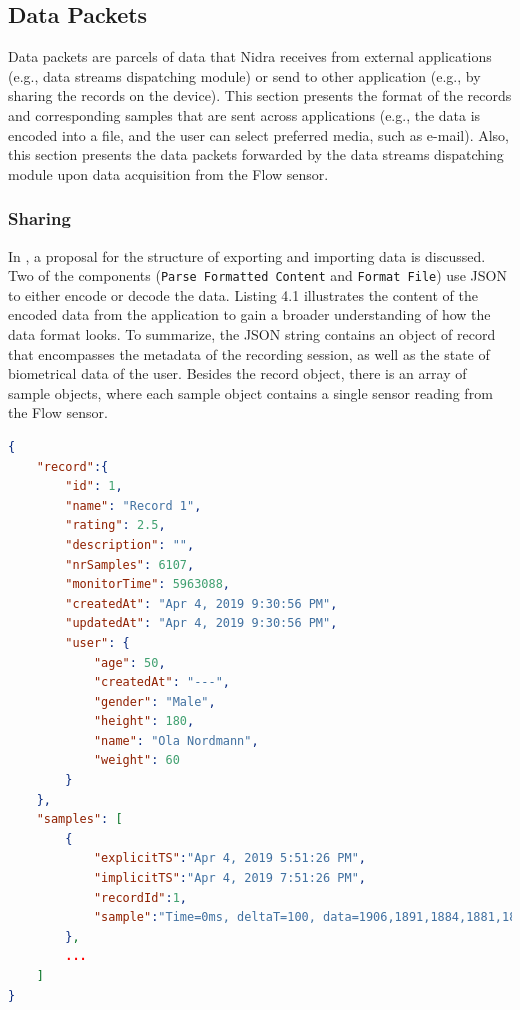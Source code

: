 \subsection{Data Packets}\label{design:datapackets}
Data packets are parcels of data that Nidra receives from external applications (e.g., data streams dispatching module) or send to other application (e.g., by sharing the records on the device). This section presents the format of the records and corresponding samples that are sent across applications (e.g., the data is encoded into a file, and the user can select preferred media, such as e-mail). Also, this section presents the data packets forwarded by the data streams dispatching module upon data acquisition from the Flow sensor.

\subsubsection{Sharing}

In , a proposal for the structure of exporting and importing data is discussed. Two of the components (\verb|Parse Formatted Content| and \verb|Format File|) use JSON to either encode or decode the data. Listing 4.1 illustrates the content of the encoded data from the application to gain a broader understanding of how the data format looks. To summarize, the JSON string contains an object of record that encompasses the metadata of the recording session, as well as the state of biometrical data of the user. Besides the record object, there is an array of sample objects, where each sample object contains a single sensor reading from the Flow sensor. 

\begin{lstlisting}[language=json, caption={A JSON string object that contains the record which has metadata from the recording session (including the biometrical data of the user), and a list of samples (where each samples contains a single sensor reading).}, captionpos=b]
{
    "record":{  
        "id": 1,
        "name": "Record 1",
        "rating": 2.5,
        "description": "",
        "nrSamples": 6107,
        "monitorTime": 5963088,
        "createdAt": "Apr 4, 2019 9:30:56 PM",
        "updatedAt": "Apr 4, 2019 9:30:56 PM",
        "user": {  
            "age": 50,
            "createdAt": "---",
            "gender": "Male",
            "height": 180,
            "name": "Ola Nordmann",
            "weight": 60
        }
    },
    "samples": [  
        {  
            "explicitTS":"Apr 4, 2019 5:51:26 PM",
            "implicitTS":"Apr 4, 2019 7:51:26 PM",
            "recordId":1,
            "sample":"Time=0ms, deltaT=100, data=1906,1891,1884,1881,1876,1718,1690"
        },
        ...
    ]
}
\end{lstlisting}

